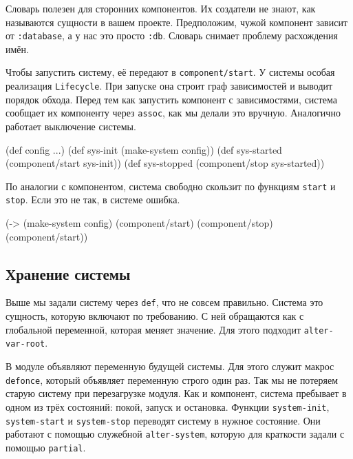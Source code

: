 Словарь полезен для сторонних компонентов. Их создатели не знают, как называются
сущности в вашем проекте. Предположим, чужой компонент зависит от
\verb|:database|, а у нас это просто \verb|:db|. Словарь снимает проблему
расхождения имён.

Чтобы запустить систему, её передают в \verb|component/start|. У системы
особая реализация \verb|Lifecycle|. При запуске она строит граф зависимостей и
выводит порядок обхода. Перед тем как запустить компонент с зависимостями,
система сообщает их компоненту через \verb|assoc|, как мы делали это
вручную. Аналогично работает выключение системы.

\begin{english}
  \begin{clojure}
(def config {...})
(def sys-init (make-system config))
(def sys-started (component/start sys-init))
(def sys-stopped (component/stop sys-started))
  \end{clojure}
\end{english}

По аналогии с компонентом, система свободно скользит по функциям \verb|start|
и \verb|stop|. Если это не так, в системе ошибка.

\begin{english}
  \begin{clojure}
(-> (make-system config)
    (component/start)
    (component/stop)
    (component/start))
  \end{clojure}
\end{english}

\subsection{Хранение системы}


Выше мы задали систему через \verb|def|, что не совсем правильно. Система это
сущность, которую включают по требованию. С ней обращаются как с глобальной
переменной, которая меняет значение. Для этого подходит \verb|alter-var-root|.

В модуле объявляют переменную будущей системы. Для этого служит макрос
\verb|defonce|, который объявляет переменную строго один раз. Так мы не
потеряем старую систему при перезагрузке модуля. Как и компонент, система
пребывает в одном из трёх состояний: покой, запуск и остановка. Функции
\verb|system-init|, \verb|system-start| и \verb|system-stop| переводят
систему в нужное состояние. Они работают с помощью служебной
\verb|alter-system|, которую для краткости задали с помощью \verb|partial|.

